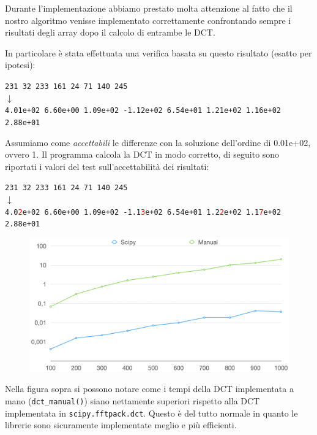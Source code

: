 \documentclass[preprint,12pt]{elsarticle}
\begin{document}
Durante l'implementazione abbiamo prestato molta attenzione al fatto che il nostro algoritmo venisse implementato correttamente confrontando sempre i risultati degli array dopo il calcolo di entrambe le DCT.


In particolare è stata effettuata una verifica basata su questo risultato (esatto per ipotesi):

\begin{center}
	\texttt{231 32 233 161 24 71 140 245}\\
	\vspace{2mm}
	$\downarrow$\\
	\vspace{2mm}
	\texttt{4.01e+02 6.60e+00 1.09e+02 -1.12e+02 6.54e+01 1.21e+02 1.16e+02 2.88e+01
}
\end{center}

 Assumiamo come \textit{accettabili} le differenze con la soluzione dell'ordine di 0.01e+02, ovvero 1. Il programma calcola la DCT in modo corretto, di seguito sono riportati i valori del test sull'accettabilità dei risultati:

\begin{center}
	\texttt{231 32 233 161 24 71 140 245}\\
	\vspace{2mm}
	$\downarrow$\\
	\vspace{2mm}
	\texttt{4.0\textcolor{red}{2}e+02 6.60e+00 1.09e+02 -1.1\textcolor{red}{3}e+02 6.54e+01 1.2\textcolor{red}{2}e+02 1.1\textcolor{red}{7}e+02 2.88e+01
}
\end{center}

\begin{figure}[H]
	\centering
	\includegraphics[width=\linewidth]{grafico}
\end{figure}

Nella figura sopra si possono notare come i tempi della DCT implementata a mano (\texttt{dct\_manual()}) siano nettamente superiori rispetto alla DCT implementata in \texttt{scipy.fftpack.dct}. Questo è del tutto normale in quanto le librerie sono sicuramente implementate meglio e più efficienti.
\end{document}
